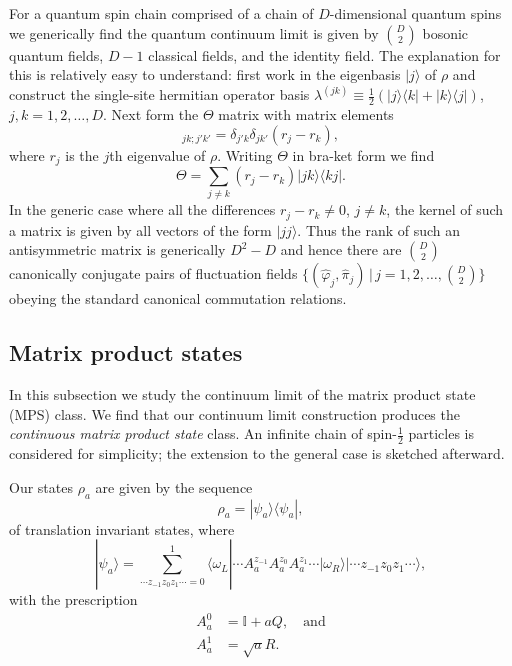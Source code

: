 \documentclass[prl,twocolumn,lengthcheck,superscriptaddress]{revtex4-1}
\theoremstyle{definition}
\theoremstyle{remark}
\begin{document}
For a quantum spin chain comprised of a chain of $D$-dimensional quantum spins we generically find the quantum continuum limit is given by $\binom{D}{2}$ bosonic quantum fields, $D-1$ classical fields, and the identity field. The explanation for this is relatively easy to understand: first work in the eigenbasis $|j\rangle$ of $\rho$ and construct the single-site hermitian operator basis $\lambda^{(jk)} \equiv \frac12(|j\rangle\langle k|+|k\rangle\langle j|)$, $j,k = 1, 2, \ldots, D$. Next form the $\Theta$ matrix with matrix elements 
\begin{equation}
	[\Theta]_{jk;j'k'} = \delta_{j'k}\delta_{jk'}( r_j - r_k),
\end{equation}
where $r_j$ is the $j$th eigenvalue of $\rho$. Writing $\Theta$ in bra-ket form we find 
\begin{equation}
	\Theta  = \sum_{j\not= k} (r_j-r_k) |jk\rangle\langle kj|.
\end{equation}
In the generic case where all the differences $r_j-r_k \not=0$, $j\not=k$, the kernel of such a matrix is given by all vectors of the form $|jj\rangle$. Thus the rank of such an antisymmetric matrix is generically $D^2-D$ and hence there are $\binom{D}{2}$ canonically conjugate pairs of fluctuation fields $\{(\widehat{\varphi}_j, \widehat{\pi}_j)\,|\, j= 1, 2, \ldots, \binom{D}{2}\}$ obeying the standard canonical commutation relations. 

\subsection{Matrix product states}
In this subsection we study the continuum limit of the matrix product state (MPS) class. We find that our continuum limit construction produces the \emph{continuous matrix product state} class. An infinite chain of spin-$\frac12$ particles is considered for simplicity; the extension to the general case is sketched afterward. 

Our states $\rho_a$ are given by the sequence
\begin{equation}
	\rho_a = |\psi_a\rangle\langle \psi_a|,
\end{equation}
of translation invariant states, where
\begin{equation}
	|\psi_a\rangle = \sum_{\cdots z_{-1}z_0z_{1} \cdots = 0}^{1}\langle \omega_L| \cdots A^{z_{-1}}_aA^{z_{0}}_a A^{z_{1}}_a\cdots |\omega_R\rangle |\cdots z_{-1}z_0z_{1} \cdots \rangle,
\end{equation}
with the prescription
\begin{equation}
	\begin{split}
		A^0_a &= \mathbb{I} + a Q, \quad \text{and} \\
		A^1_a &= \sqrt{a} R.
	\end{split}
\end{equation}
\end{document}
